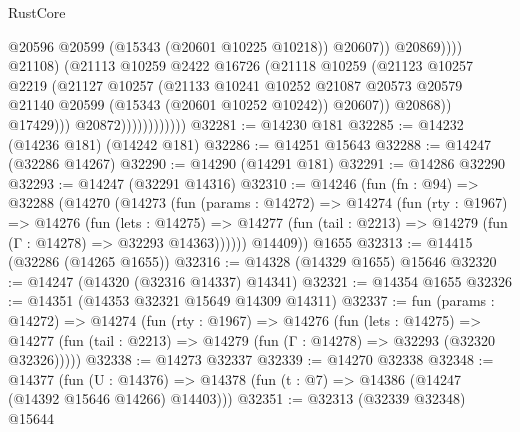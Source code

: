 \begin{lexlean}{RustCore}
\begin{coremodule}
                                              @20596
                                              @20599
                                              (@15343 (@20601 @10225 @10218))
                                              @20607))
                                          @20869))))
                                  @21108)
                                (@21113
                                  @10259
                                  @2422
                                  @16726
                                  (@21118
                                    @10259
                                    (@21123
                                      @10257
                                      @2219
                                      (@21127
                                        @10257
                                        (@21133
                                          @10241
                                          @10252
                                          @21087
                                          @20573
                                          @20579
                                          @21140
                                          @20599
                                          (@15343 (@20601 @10252 @10242))
                                          @20607))
                                      @20868))
                                  @17429)))
                            @20872))))))))))))
@32281 := @14230 @181
@32285 := @14232 (@14236 @181) (@14242 @181)
@32286 := @14251 @15643
@32288 := @14247 (@32286 @14267)
@32290 := @14290 (@14291 @181)
@32291 := @14286 @32290
@32293 := @14247 (@32291 @14316)
@32310 := @14246
    (fun (fn : @94) =>
    @32288
      (@14270
        (@14273
          (fun (params : @14272) =>
          @14274
            (fun (rty : @1967) =>
            @14276
              (fun (lets : @14275) =>
              @14277 (fun (tail : @2213) => @14279 (fun (Γ : @14278) => @32293 @14363))))))
        @14409))
    @1655
@32313 := @14415 (@32286 (@14265 @1655))
@32316 := @14328 (@14329 @1655) @15646
@32320 := @14247 (@14320 (@32316 @14337) @14341)
@32321 := @14354 @1655
@32326 := @14351 (@14353 @32321 @15649 @14309 @14311)
@32337 := fun (params : @14272) =>
  @14274
    (fun (rty : @1967) =>
    @14276
      (fun (lets : @14275) =>
      @14277 (fun (tail : @2213) => @14279 (fun (Γ : @14278) => @32293 (@32320 @32326)))))
@32338 := @14273 @32337
@32339 := @14270 @32338
@32348 := @14377
    (fun (U : @14376) => @14378 (fun (t : @7) => @14386 (@14247 (@14392 @15646 @14266) @14403)))
@32351 := @32313 (@32339 @32348) @15644

\end{coremodule}
\end{lexlean}
